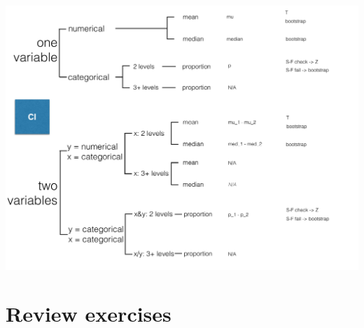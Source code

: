 \documentclass[11pt,containsverbatim,handout,xcolor=xelatex,dvipsnames,table]{beamer}
\begin{document}

\begin{frame}

\begin{center}
\includegraphics[width=\textwidth]{figures/mt2_review_map3}
\end{center}

\end{frame}


\section{Review exercises}

\end{document}
